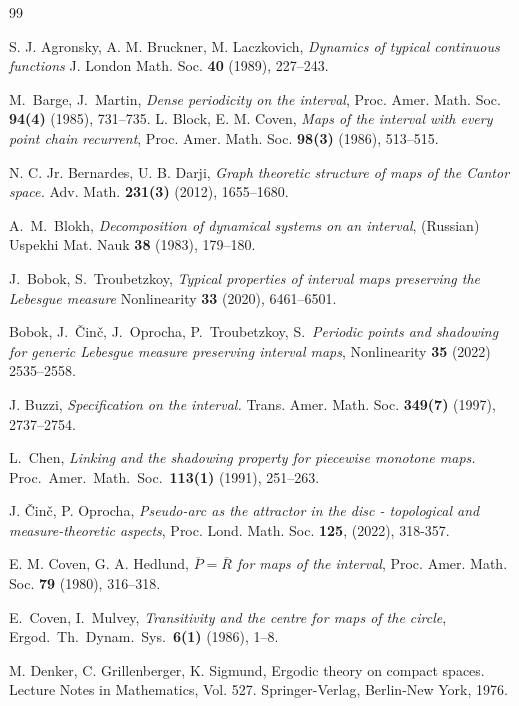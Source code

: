 \documentclass[12pt, a4paper]{amsart}
\newcommand{\?}{{\bf ???}}
\begin{document}
\begin{thebibliography}{99}

  S. J. Agronsky, A. M. Bruckner, M. Laczkovich,
\textit{Dynamics of typical continuous functions}
J. London Math. Soc. {\bf 40} (1989), 227--243.

M.\ Barge, J.\ Martin, \textit{Dense periodicity on the interval}, Proc. Amer. Math. Soc. \textbf{94(4)} (1985), 731--735.
 L. Block, E. M. Coven, \textit{Maps of the interval with every point chain recurrent},  Proc. Amer. Math. Soc.  {\bf 98(3)} (1986),
513--515.

 N. C. Jr. Bernardes, U. B. Darji, \textit{Graph theoretic structure of maps of the Cantor space.} Adv. Math. {\bf 231(3)} (2012), 1655--1680.


 A.\ M.\ Blokh, \textit{Decomposition of dynamical systems on an interval}, (Russian) Uspekhi Mat. Nauk {\bf 38} (1983), 179--180.

 J.\ Bobok, S.\ Troubetzkoy,  {\it Typical properties of interval maps preserving the Lebesgue measure} Nonlinearity \textbf{33} (2020), 6461--6501.

 Bobok, J.\, \v Cin\v c, J.\, Oprocha, P.\, Troubetzkoy, S.\, {\it Periodic points and shadowing for generic Lebesgue measure preserving interval maps}, Nonlinearity \textbf{35} (2022) 2535--2558.


 J. Buzzi,  \textit{Specification on the interval.} Trans. Amer. Math. Soc. \textbf{349(7)} (1997), 2737--2754.

 L.\ Chen, \textit{Linking and the shadowing property for piecewise monotone maps.} Proc.\ Amer.\ Math.\ Soc.\ {\bf 113(1)} (1991), 251--263. 

 J. \v Cin\v c, P. Oprocha,  {\it Pseudo-arc as the attractor in the disc - topological and measure-theoretic aspects}, Proc. Lond. Math. Soc. \textbf{125}, (2022), 318-357.

E. M. Coven, G. A. Hedlund, \textit{$\overline{P}=\overline{R}$ for maps of the interval}, Proc. Amer. Math. Soc. \textbf{79} (1980), 316--318.

 E.\ Coven, I.\ Mulvey, {\it  Transitivity and the centre for maps of the circle},
Ergod.\ Th.\ Dynam.\ Sys.\ \textbf{6(1)} (1986), 1--8.


 M. Denker, C. Grillenberger, K. Sigmund, Ergodic theory on compact spaces. 
Lecture Notes in Mathematics, Vol. 527. Springer-Verlag, Berlin-New York, 1976. 


\end{thebibliography}
\end{document}
